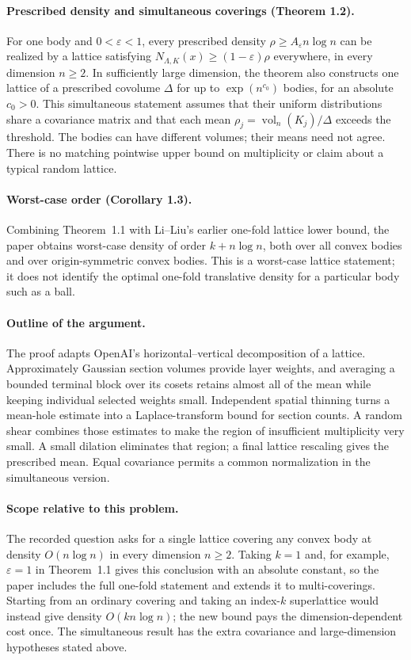 \documentclass[11pt]{article}
\begin{document}
\paragraph{Prescribed density and simultaneous coverings (Theorem 1.2).}
For one body and $0<\varepsilon<1$, every prescribed density
$\rho\geq A_\varepsilon n\log n$ can be realized by a lattice satisfying
$N_{\Lambda,K}(x)\geq(1-\varepsilon)\rho$ everywhere, in every
dimension $n\geq2$. In sufficiently large dimension, the theorem also
constructs one lattice of a prescribed covolume $\Delta$ for up to
$\exp(n^{c_0})$ bodies, for an absolute $c_0>0$. This simultaneous
statement assumes that their uniform distributions share a covariance
matrix and that each mean
$\rho_j=\operatorname{vol}_n(K_j)/\Delta$ exceeds the threshold.
The bodies can have different volumes; their means need not agree.
There is no matching pointwise upper bound on multiplicity or
claim about a typical random lattice.

\paragraph{Worst-case order (Corollary 1.3).}
Combining Theorem~1.1 with Li--Liu's earlier one-fold lattice lower bound,
the paper obtains worst-case density of order $k+n\log n$, both over all
convex bodies and over origin-symmetric convex bodies. This is a
worst-case lattice statement; it does not identify the optimal
one-fold translative density for a particular body such as a ball.

\paragraph{Outline of the argument.}
The proof adapts OpenAI's horizontal--vertical decomposition of a lattice.
Approximately Gaussian section volumes provide layer weights, and
averaging a bounded terminal block over its cosets retains almost all of
the mean while keeping individual selected weights small. Independent
spatial thinning turns a mean-hole estimate into a Laplace-transform
bound for section counts. A random shear combines those estimates to
make the region of insufficient multiplicity very small. A small
dilation eliminates that region; a final lattice rescaling gives the
prescribed mean. Equal covariance permits a common normalization in the
simultaneous version.

\paragraph{Scope relative to this problem.}
The recorded question asks for a single lattice covering any convex body
at density $O(n\log n)$ in every dimension $n\geq2$.
Taking $k=1$ and, for example, $\varepsilon=1$ in Theorem~1.1
gives this conclusion with an absolute constant, so the paper includes
the full one-fold statement and extends it to multi-coverings.
Starting from an ordinary covering and taking an index-$k$ superlattice
would instead give density $O(kn\log n)$; the new bound pays the
dimension-dependent cost once. The simultaneous result has the extra
covariance and large-dimension hypotheses stated above.
\end{document}
